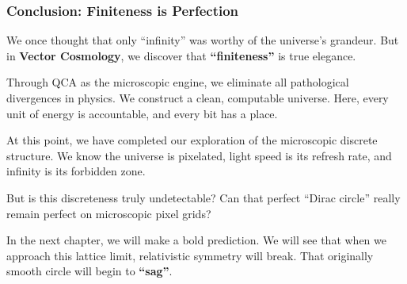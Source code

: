 \subsubsection{Conclusion: Finiteness is Perfection}

We once thought that only ``infinity'' was worthy of the universe's grandeur. But in \textbf{Vector Cosmology}, we discover that \textbf{``finiteness''} is true elegance.

Through QCA as the microscopic engine, we eliminate all pathological divergences in physics. We construct a clean, computable universe. Here, every unit of energy is accountable, and every bit has a place.

At this point, we have completed our exploration of the microscopic discrete structure. We know the universe is pixelated, light speed is its refresh rate, and infinity is its forbidden zone.

But is this discreteness truly undetectable? Can that perfect ``Dirac circle'' really remain perfect on microscopic pixel grids?

In the next chapter, we will make a bold prediction. We will see that when we approach this lattice limit, relativistic symmetry will break. That originally smooth circle will begin to \textbf{``sag''}.

